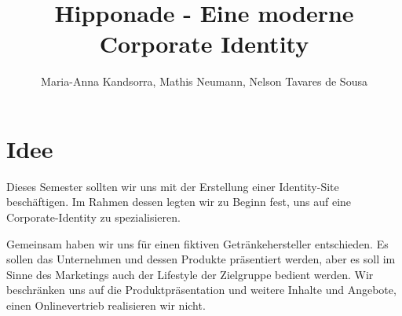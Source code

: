 \documentclass[12pt,a4paper,oneside,ngerman]{article}
\begin{document}
\title{Hipponade - Eine moderne Corporate Identity} %
\author{Maria-Anna Kandsorra, Mathis Neumann, Nelson Tavares de Sousa}
\maketitle
\newpage

\tableofcontents

%
%
%
%

\newpage

\section{Idee} %
Dieses Semester sollten wir uns mit der Erstellung einer Identity-Site beschäftigen.
Im Rahmen dessen legten wir zu Beginn fest, uns auf eine Corporate-Identity zu spezialisieren.

Gemeinsam haben wir uns für einen fiktiven Getränkehersteller entschieden. Es sollen das Unternehmen und dessen Produkte präsentiert werden, aber es soll im Sinne des Marketings auch der Lifestyle der Zielgruppe bedient werden. 
Wir beschränken uns auf die Produktpräsentation und weitere Inhalte und Angebote, einen Onlinevertrieb realisieren wir nicht.
\end{document}
